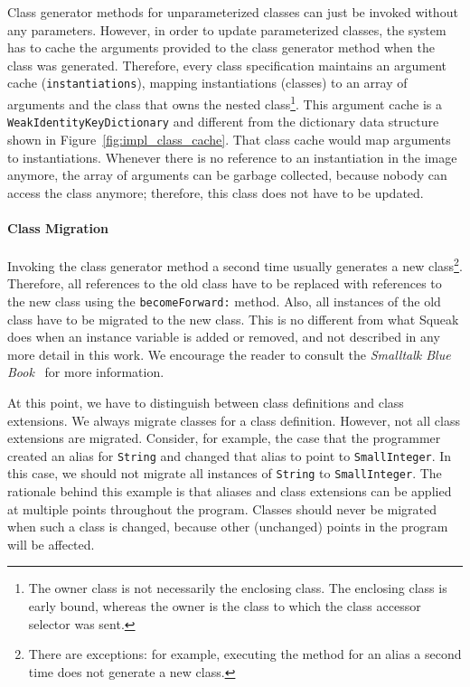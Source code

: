 Class generator methods for unparameterized classes can just be invoked without any parameters. However, in order to update parameterized classes, the system has to cache the arguments provided to the class generator method when the class was generated. Therefore, every class specification maintains an argument cache (\texttt{instantiations}), mapping instantiations (classes) to an array of arguments and the class that owns the nested class\footnote{The owner class is not necessarily the enclosing class. The enclosing class is early bound, whereas the owner is the class to which the class accessor selector was sent.}. This argument cache is a \texttt{WeakIdentityKeyDictionary} and different from the dictionary data structure shown in Figure~\ref{fig:impl_class_cache}. That class cache would map arguments to instantiations. Whenever there is no reference to an instantiation in the image anymore, the array of arguments can be garbage collected, because nobody can access the class anymore; therefore, this class does not have to be updated.

\paragraph{Class Migration}
Invoking the class generator method a second time usually generates a new class\footnote{There are exceptions: for example, executing the method for an alias a second time does not generate a new class.}. Therefore, all references to the old class have to be replaced with references to the new class using the \texttt{becomeForward:} method. Also, all instances of the old class have to be migrated to the new class. This is no different from what Squeak does when an instance variable is added or removed, and not described in any more detail in this work. We encourage the reader to consult the \emph{Smalltalk Blue Book}~\cite{Goldberg:1983:SLI:273} for more information.

At this point, we have to distinguish between class definitions and class extensions. We always migrate classes for a class definition. However, not all class extensions are migrated. Consider, for example, the case that the programmer created an alias for \texttt{String} and changed that alias to point to \texttt{SmallInteger}. In this case, we should not migrate all instances of \texttt{String} to \texttt{SmallInteger}. The rationale behind this example is that aliases and class extensions can be applied at multiple points throughout the program. Classes should never be migrated when such a class is changed, because other (unchanged) points in the program will be affected. 

